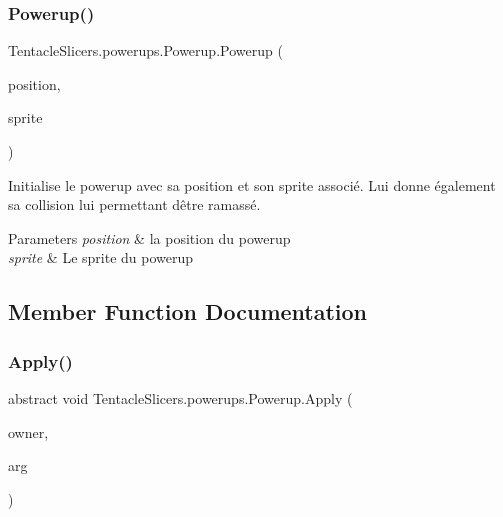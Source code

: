 \subsubsection{\texorpdfstring{Powerup()}{Powerup()}}
{\footnotesize\ttfamily Tentacle\+Slicers.\+powerups.\+Powerup.\+Powerup (\begin{DoxyParamCaption}\item[{Point}]{position,  }\item[{\hyperlink{class_tentacle_slicers_1_1graphics_1_1_custom_sprite}{Custom\+Sprite}}]{sprite }\end{DoxyParamCaption})\hspace{0.3cm}{\ttfamily [protected]}}



Initialise le powerup avec sa position et son sprite associé. Lui donne également sa collision lui permettant d\textquotesingle{}être ramassé. 


\begin{DoxyParams}{Parameters}
{\em position} & la position du powerup \\
\hline
{\em sprite} & Le sprite du powerup \\
\hline
\end{DoxyParams}


\subsection{Member Function Documentation}
\mbox{\label{class_tentacle_slicers_1_1powerups_1_1_powerup_a64288aa9b1e9f242082be54f1d73f8ba}} 
\subsubsection{\texorpdfstring{Apply()}{Apply()}}
{\footnotesize\ttfamily abstract void Tentacle\+Slicers.\+powerups.\+Powerup.\+Apply (\begin{DoxyParamCaption}\item[{\hyperlink{class_tentacle_slicers_1_1actors_1_1_player_character}{Player\+Character}}]{owner,  }\item[{int}]{arg }\end{DoxyParamCaption})\hspace{0.3cm}{\ttfamily [pure virtual]}}



